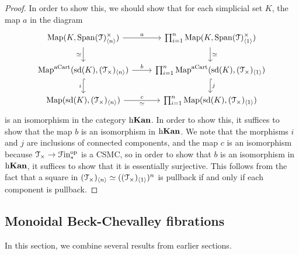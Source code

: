\documentclass[main.tex]{subfiles}
\begin{document}
\begin{proof}
  In order to show this, we should show that for each simplicial set $K$, the map $a$ in the diagram
  \begin{equation*}
    \begin{tikzcd}
      \Map(K, \Span(\category{T})^{\times}_{\langle n \rangle})
      \arrow[r, "a"]
      \arrow[d, swap, "\simeq"]
      & \prod_{i = 1}^{n} \Map(K, \Span(\category{T})^{\times}_{\langle 1 \rangle})
      \arrow[d, "\simeq"]
      \\
      \Map^{\aCart}(\sd(K), (\category{T}_{\times})_{\langle n \rangle}) \arrow[r, "b"]
      \arrow[d, hook, "i"{swap}]
      & \prod_{i = 1}^{n} \Map^{\aCart}(\sd(K), (\category{T}_{\times})_{\langle 1 \rangle})
      \arrow[d, hook, "j"]
      \\
      \Map(\sd(K), (\category{T}_{\times})_{\langle n \rangle}) \arrow[r, "c", "\simeq"{swap}]
      & \prod_{i = 1}^{n} \Map(\sd(K), (\category{T}_{\times})_{\langle 1 \rangle})
    \end{tikzcd}
  \end{equation*}
  is an isomorphism in the category $\mathrm{h} \mathbf{Kan}$. In order to show this, it suffices to show that the map $b$ is an isomorphism in $\mathrm{h} \mathbf{Kan}$. We note that the morphisms $i$ and $j$ are inclusions of connected components, and the map $c$ is an isomorphism because $\mathcal{T}_{\times} \to \mathcal{F}\mathrm{in}_{*}^{\mathrm{op}}$ is a CSMC, so in order to show that $b$ is an isomorphism in $\mathrm{h}\mathbf{Kan}$, it suffices to show that it is essentially surjective. This follows from the fact that a square in $(\mathcal{T}_{\times})_{\langle n \rangle} \simeq ((\mathcal{T}_{\times})_{\langle 1 \rangle})^{n}$ is pullback if and only if each component is pullback.
\end{proof}


\subsection{Monoidal Beck-Chevalley fibrations}
\label{ssc:monoidal_beck_chevalley_fibrations}


In this section, we combine several results from earlier sections.
\end{document}
